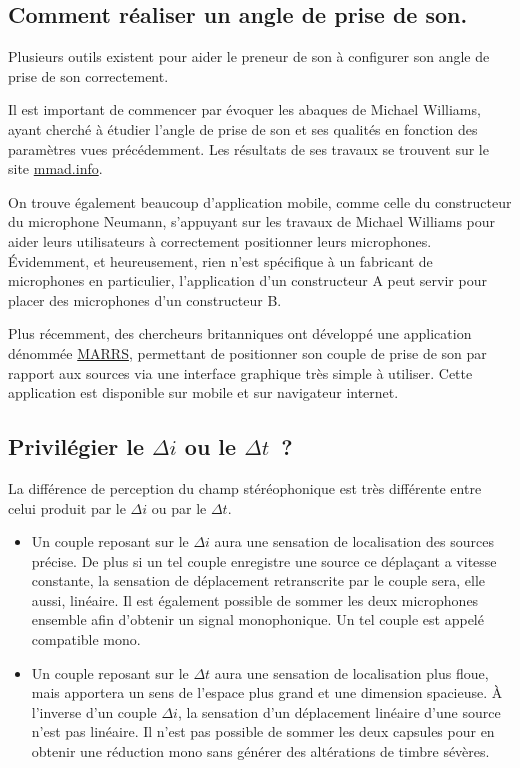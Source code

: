 \documentclass[
]{book}
\providecommand{\tightlist}{%
  \setlength{\itemsep}{0pt}\setlength{\parskip}{0pt}}
\begin{document}
\hypertarget{comment-ruxe9aliser-un-angle-de-prise-de-son.}{%
\subsection{Comment réaliser un angle de prise de son.}\label{comment-ruxe9aliser-un-angle-de-prise-de-son.}}

Plusieurs outils existent pour aider le preneur de son à configurer son angle de prise de son correctement.

Il est important de commencer par évoquer les abaques de Michael Williams, ayant cherché à étudier l'angle de prise de son et ses qualités en fonction des paramètres vues précédemment. Les résultats de ses travaux se trouvent sur le site \href{https://www.mmad.info/MAD/2\%20Ch/2ch.htm}{mmad.info}.

On trouve également beaucoup d'application mobile, comme celle du constructeur du microphone Neumann, s'appuyant sur les travaux de Michael Williams pour aider leurs utilisateurs à correctement positionner leurs microphones. Évidemment, et heureusement, rien n'est spécifique à un fabricant de microphones en particulier, l'application d'un constructeur A peut servir pour placer des microphones d'un constructeur B.

Plus récemment, des chercheurs britanniques ont développé une application dénommée \href{https://marrsweb.hud.ac.uk/}{MARRS}, permettant de positionner son couple de prise de son par rapport aux sources via une interface graphique très simple à utiliser. Cette application est disponible sur mobile et sur navigateur internet.

\hypertarget{priviluxe9gier-le-delta-i-ou-le-delta-t}{%
\subsection{\texorpdfstring{Privilégier le \(\Delta i\) ou le \(\Delta t\)~?}{Privilégier le \textbackslash Delta i ou le \textbackslash Delta t~?}}\label{priviluxe9gier-le-delta-i-ou-le-delta-t}}

La différence de perception du champ stéréophonique est très différente entre celui produit par le \(\Delta i\) ou par le \(\Delta t\).

\begin{itemize}
\tightlist
\item
  Un couple reposant sur le \(\Delta i\) aura une sensation de localisation des sources précise. De plus si un tel couple enregistre une source ce déplaçant a vitesse constante, la sensation de déplacement retranscrite par le couple sera, elle aussi, linéaire. Il est également possible de sommer les deux microphones ensemble afin d'obtenir un signal monophonique. Un tel couple est appelé compatible mono.
\item
  Un couple reposant sur le \(\Delta t\) aura une sensation de localisation plus floue, mais apportera un sens de l'espace plus grand et une dimension spacieuse. À l'inverse d'un couple \(\Delta i\), la sensation d'un déplacement linéaire d'une source n'est pas linéaire. Il n'est pas possible de sommer les deux capsules pour en obtenir une réduction mono sans générer des altérations de timbre sévères.
\end{itemize}
\end{document}
